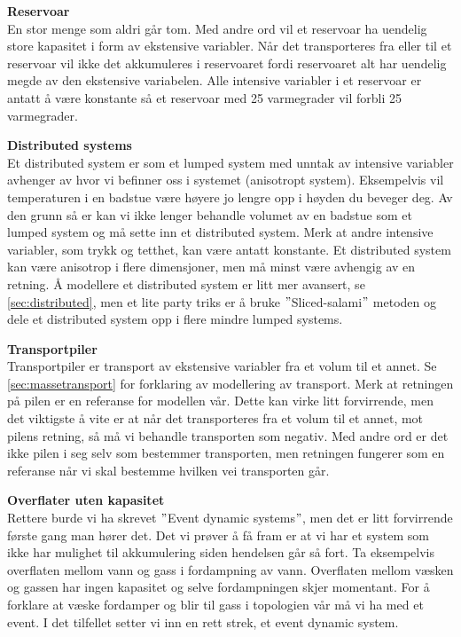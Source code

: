 \textbf{Reservoar} \\
En stor menge som aldri går tom. Med andre ord vil et reservoar ha uendelig store kapasitet i form av ekstensive variabler. Når det transporteres fra eller til et reservoar vil ikke det akkumuleres i reservoaret fordi reservoaret alt har uendelig megde av den ekstensive variabelen. Alle intensive variabler i et reservoar er antatt å være konstante så et reservoar med 25 varmegrader vil forbli 25 varmegrader.

\textbf{Distributed systems}\\
Et distributed system er som et lumped system med unntak av intensive variabler avhenger av hvor vi befinner oss i systemet (anisotropt system). Eksempelvis vil temperaturen i en badstue være høyere jo lengre opp i høyden du beveger deg. Av den grunn så er kan vi ikke lenger behandle volumet av en badstue som et lumped system og må sette inn et distributed system. Merk at andre intensive variabler, som trykk og tetthet, kan være antatt konstante. Et distributed system kan være anisotrop i flere dimensjoner, men må minst være avhengig av en retning. Å modellere et distributed system er litt mer avansert, se \cref{sec:distributed}, men et lite party triks er å bruke $"$Sliced-salami$"$ metoden og dele et distributed system opp i flere mindre lumped systems. 


\textbf{Transportpiler}\\
Transportpiler er transport av ekstensive variabler fra et volum til et annet. Se \cref{sec:massetransport} for forklaring av modellering av transport. Merk at retningen på pilen er en referanse for modellen vår. Dette kan virke litt forvirrende, men det viktigste å vite er at når det transporteres fra et volum til et annet, mot pilens retning, så må vi behandle transporten som negativ. Med andre ord er det ikke pilen i seg selv som bestemmer transporten, men retningen fungerer som en referanse når vi skal bestemme hvilken vei transporten går. 

\textbf{Overflater uten kapasitet}\\
Rettere burde vi ha skrevet $"$Event dynamic systems$"$, men det er litt forvirrende første gang man hører det. Det vi prøver å få fram er at vi har et system som ikke har mulighet til akkumulering siden hendelsen går så fort. Ta eksempelvis overflaten mellom vann og gass i fordampning av vann. Overflaten mellom væsken og gassen har ingen kapasitet og selve fordampningen skjer momentant. For å forklare at væske fordamper og blir til gass i topologien vår må vi ha med et event. I det tilfellet setter vi inn en rett strek, et event dynamic system. 

